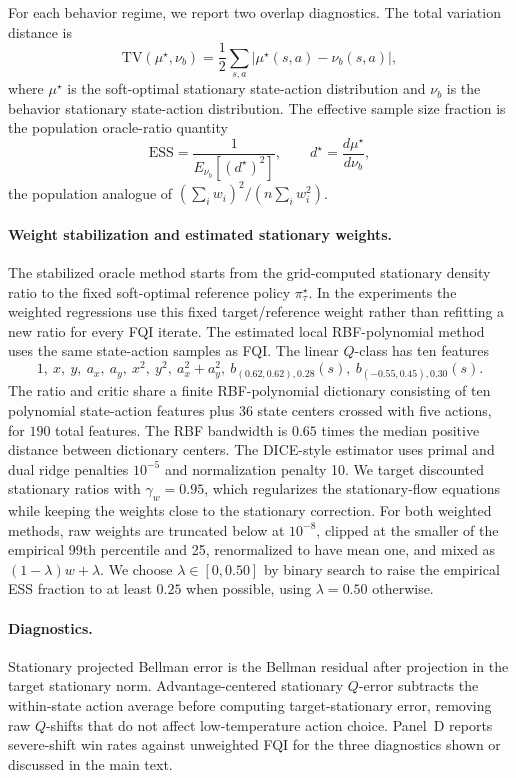 \documentclass{article}
\theoremstyle{plain}
\theoremstyle{definition}
\theoremstyle{remark}
\begin{document}
For each behavior regime, we report two overlap diagnostics. The total
variation distance is
\[
\mathrm{TV}(\mu^\star,\nu_b)
=
\frac12\sum_{s,a}\left|\mu^\star(s,a)-\nu_b(s,a)\right|,
\]
where \(\mu^\star\) is the soft-optimal stationary state-action distribution and
\(\nu_b\) is the behavior stationary state-action distribution. The effective
sample size fraction is the population oracle-ratio quantity
\[
\mathrm{ESS}
=
\frac{1}{E_{\nu_b}[(d^\star)^2]},
\qquad
d^\star=\frac{d\mu^\star}{d\nu_b},
\]
the population analogue of \((\sum_i w_i)^2/(n\sum_i w_i^2)\).

\paragraph{Weight stabilization and estimated stationary weights.}
The stabilized oracle method starts from the grid-computed stationary density
ratio to the fixed soft-optimal reference policy \(\pi^\star_\tau\). In the
experiments the weighted regressions use this fixed target/reference weight
rather than refitting a new ratio for every FQI iterate. The estimated local
RBF-polynomial method uses the same state-action samples as FQI. The linear
\(Q\)-class has ten features
\[
1,\ x,\ y,\ a_x,\ a_y,\ x^2,\ y^2,\ a_x^2+a_y^2,\ 
b_{(0.62,0.62),0.28}(s),\ b_{(-0.55,0.45),0.30}(s).
\]
The ratio and critic share a finite RBF-polynomial dictionary consisting of ten
polynomial state-action features plus \(36\) state centers crossed with five
actions, for \(190\) total features. The RBF bandwidth is \(0.65\) times the
median positive distance between dictionary centers. The DICE-style estimator
uses primal and dual ridge penalties \(10^{-5}\) and normalization penalty
10. We target discounted stationary ratios with \(\gamma_w=0.95\), which
regularizes the stationary-flow equations while keeping the weights close to
the stationary correction. For both weighted methods, raw weights are truncated
below at \(10^{-8}\), clipped at the smaller of the empirical 99th percentile
and 25, renormalized to have mean one, and mixed as
\((1-\lambda)w+\lambda\). We choose \(\lambda\in[0,0.50]\) by binary search to
raise the empirical ESS fraction to at least \(0.25\) when possible, using
\(\lambda=0.50\) otherwise.

\paragraph{Diagnostics.}
Stationary projected Bellman error is the Bellman residual after projection in
the target stationary norm. Advantage-centered stationary \(Q\)-error subtracts
the within-state action average before computing target-stationary error,
removing raw \(Q\)-shifts that do not affect low-temperature action choice.
Panel~D reports severe-shift win rates against unweighted FQI for the three
diagnostics shown or discussed in the main text.
\end{document}
